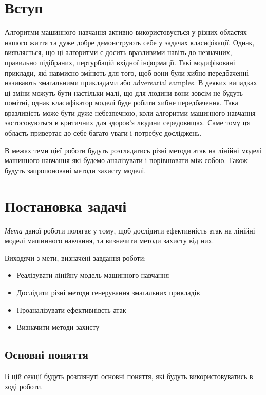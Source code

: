 \documentclass[a4paper,14pt]{extreport}
\begin{document}
	\chapter*{Вступ}
	Алгоритми машинного навчання активно використовується у різних областях нашого життя та дуже добре демонструють себе у задачах класифікації. Однак, виявляється, що ці алгоритми є досить вразливими навіть до незначних, правильно підібраних, пертурбацій вхідної інформації. Такі модифіковані приклади, які навмисно змінють для того, щоб вони були хибно передбаченні називають змагальними прикладами або adversarial samples. В деяких випадках ці зміни можуть бути настільки малі, що для людини вони зовсім не будуть помітні, однак класифікатор моделі буде робити хибне передбачення. Така вразливість може бути дуже небезпечною, коли алгоритми машинного навчання застосовуються в критичних для здоров'я людини середовищах. Саме тому ця область привертає до себе багато уваги і потребує досліджень. 
	
	В межах теми цієї роботи будуть розглядатись різні методи атак на лінійні моделі машинного навчання які будемо аналізувати і порівнювати між собою. Також будуть запропоновані методи захисту моделі.

	\chapter{Постановка задачі} 
	\textit{Мета} даної роботи полягає у тому, щоб дослідити ефективність атак на лінійні моделі машинного навчання, та визначити методи захисту від них. \par
	Виходячи з мети, визначені завдання роботи:
	\begin{itemize}
	\item Реалізувати лінійну модель машинного навчання
	\item Дослідити різні методи генерування змагальних прикладів
	\item Проаналізувати ефективнівсть атак
	\item Визначити методи захисту
	\end{itemize}

	
	\section{Основні поняття}
	
	В цій секції будуть розглянуті основні поняття, які будуть використовуватись в ході роботи. 
	
\end{document}
